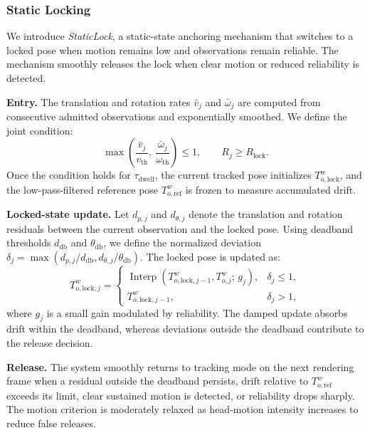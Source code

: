 \documentclass[review]{vgtc}
\begin{document}
\subsubsection{Static Locking}\label{sec:staticlock}

We introduce \emph{StaticLock}, a static-state anchoring mechanism that switches to a locked pose when motion remains low and observations remain reliable. The mechanism smoothly releases the lock when clear motion or reduced reliability is detected.

\textbf{Entry.}
The translation and rotation rates $\bar v_j$ and $\bar\omega_j$ are computed from consecutive admitted observations and exponentially smoothed. We define the joint condition:
\begin{equation}
\max\left(\frac{\bar{v}_j}{v_{\mathrm{th}}},\ \frac{\bar{\omega}_j}{\omega_{\mathrm{th}}}\right) \leq 1, \qquad R_j \geq R_{\mathrm{lock}}.
\label{eq:lock-entry}
\end{equation}
Once the condition holds for $\tau_{\mathrm{dwell}}$, the current tracked pose initializes $T_{o,\mathrm{lock}}^w$, and the low-pass-filtered reference pose $T_{o,\mathrm{ref}}^w$ is frozen to measure accumulated drift.

\textbf{Locked-state update.}
Let $d_{p,j}$ and $d_{\theta,j}$ denote the translation and rotation residuals between the current observation and the locked pose. Using deadband thresholds $d_{\mathrm{db}}$ and $\theta_{\mathrm{db}}$, we define the normalized deviation $\delta_j=\max(d_{p,j}/d_{\mathrm{db}},d_{\theta,j}/\theta_{\mathrm{db}})$. The locked pose is updated as:
\begin{equation}
T_{o,\mathrm{lock},j}^w =
\begin{cases}
\operatorname{Interp}\left(T_{o,\mathrm{lock},j-1}^w, T_{o,j}^{w};\, g_j\right), & \delta_j \leq 1, \\
T_{o,\mathrm{lock},j-1}^w, & \delta_j > 1,
\end{cases}
\label{eq:lock-update}
\end{equation}
where $g_j$ is a small gain modulated by reliability. The damped update absorbs drift within the deadband, whereas deviations outside the deadband contribute to the release decision.

\textbf{Release.}
The system smoothly returns to tracking mode on the next rendering frame when a residual outside the deadband persists, drift relative to $T_{o,\mathrm{ref}}^w$ exceeds its limit, clear sustained motion is detected, or reliability drops sharply. The motion criterion is moderately relaxed as head-motion intensity increases to reduce false releases.
\end{document}
